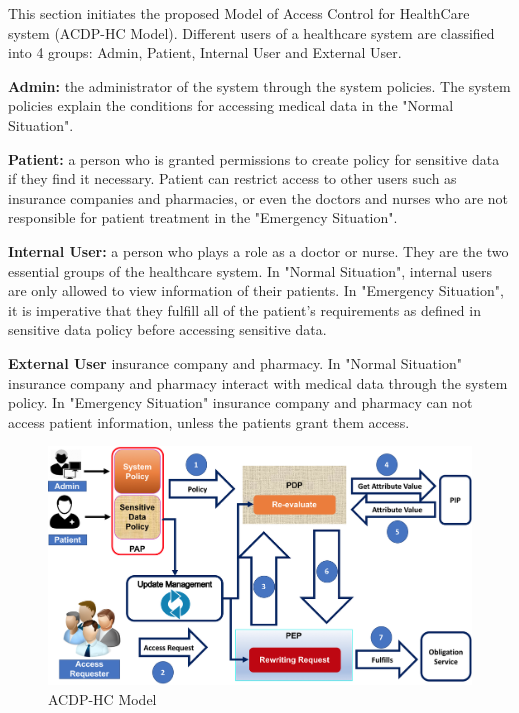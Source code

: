 \documentclass[conference]{IEEEtran}
\begin{document}
This section initiates the proposed Model of Access Control for HealthCare system (ACDP-HC Model).
Different users of a healthcare system are classified into 4 groups: Admin, Patient, Internal User and External User. 

\textbf{Admin: }the administrator of the system through the system policies. 
The system policies explain the conditions for accessing medical data in the "Normal Situation".

 \textbf{Patient: }a person who is granted permissions to create policy for sensitive data if they find it necessary. 
Patient can restrict access to other users such as insurance companies and pharmacies, or even the doctors and nurses who are not responsible for patient treatment in the "Emergency Situation".

\textbf{Internal User: }a person who plays a role as a doctor or nurse. 
They are the two essential groups of the healthcare system. 
In  "Normal Situation", internal users are only allowed to view information of their patients. 
In "Emergency Situation", it is imperative that they fulfill all of the patient's requirements as defined in sensitive data policy before accessing sensitive data.

\textbf{External User } insurance company and pharmacy. 
In "Normal Situation" insurance company and pharmacy interact with medical data through the system policy. 
In "Emergency Situation" insurance company and pharmacy can not access patient information, unless the patients grant them access.

\begin{figure}[ht!]
	\label{fig.condition}
	\centering
	\includegraphics[scale=0.3]{fig/Mainmodel.png}
	\caption{ACDP-HC Model}
\end{figure}
\end{document}
